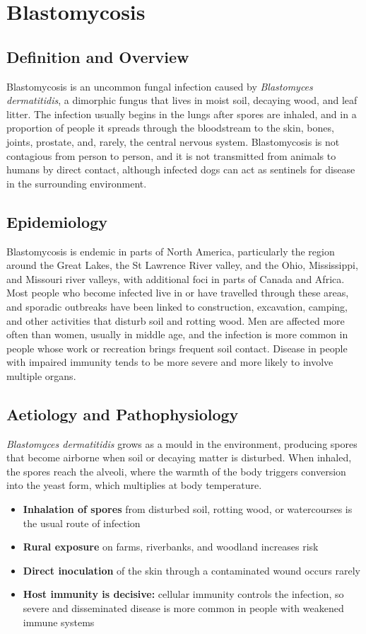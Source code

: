 \chapter{Blastomycosis}

\section*{Definition and Overview}
Blastomycosis is an uncommon fungal infection caused by \textit{Blastomyces dermatitidis}, a dimorphic fungus that lives in moist soil, decaying wood, and leaf litter. The infection usually begins in the lungs after spores are inhaled, and in a proportion of people it spreads through the bloodstream to the skin, bones, joints, prostate, and, rarely, the central nervous system. Blastomycosis is not contagious from person to person, and it is not transmitted from animals to humans by direct contact, although infected dogs can act as sentinels for disease in the surrounding environment.

\section*{Epidemiology}
Blastomycosis is endemic in parts of North America, particularly the region around the Great Lakes, the St Lawrence River valley, and the Ohio, Mississippi, and Missouri river valleys, with additional foci in parts of Canada and Africa. Most people who become infected live in or have travelled through these areas, and sporadic outbreaks have been linked to construction, excavation, camping, and other activities that disturb soil and rotting wood. Men are affected more often than women, usually in middle age, and the infection is more common in people whose work or recreation brings frequent soil contact. Disease in people with impaired immunity tends to be more severe and more likely to involve multiple organs.

\section*{Aetiology and Pathophysiology}
\textit{Blastomyces dermatitidis} grows as a mould in the environment, producing spores that become airborne when soil or decaying matter is disturbed. When inhaled, the spores reach the alveoli, where the warmth of the body triggers conversion into the yeast form, which multiplies at body temperature.

\begin{itemize}
    \item \textbf{Inhalation of spores} from disturbed soil, rotting wood, or watercourses is the usual route of infection
    \item \textbf{Rural exposure} on farms, riverbanks, and woodland increases risk
    \item \textbf{Direct inoculation} of the skin through a contaminated wound occurs rarely
    \item \textbf{Host immunity is decisive:} cellular immunity controls the infection, so severe and disseminated disease is more common in people with weakened immune systems
\end{itemize}

